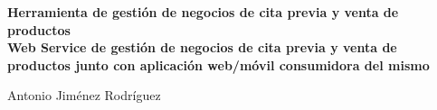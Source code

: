 \thispagestyle{empty}

\begin{center}
{\large\bfseries Herramienta de gestión de negocios de cita previa y venta de productos \\
Web Service de gestión de negocios de cita previa y venta de productos junto con
aplicación web/móvil consumidora del mismo }\\
\end{center}
\begin{center}
Antonio Jiménez Rodríguez\\
\end{center}


\vspace{0.5cm}
\vspace{0.7cm}

